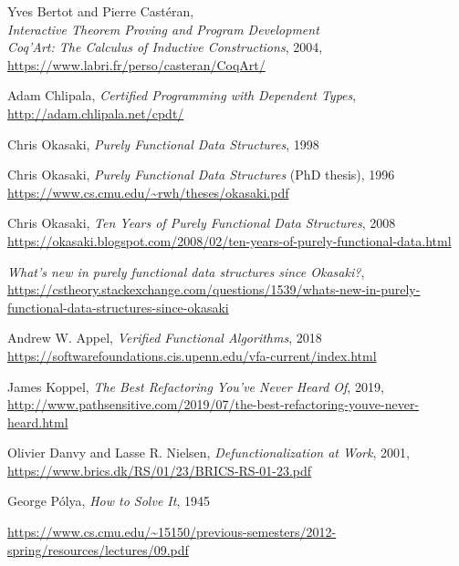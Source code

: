 \documentclass[declaration,mgr,english,shortabstract]{iithesis}
\begin{document}
\begin{thebibliography}{1}
    Yves Bertot and Pierre Castéran, \\
    \textit{Interactive Theorem Proving and Program Development \\ Coq'Art: The Calculus of Inductive Constructions}, 2004, \\
    \url{https://www.labri.fr/perso/casteran/CoqArt/}

    Adam Chlipala,
    \textit{Certified Programming with Dependent Types}, \\
    \url{http://adam.chlipala.net/cpdt/}

    Chris Okasaki,
    \textit{Purely Functional Data Structures}, 1998

    Chris Okasaki,
    \textit{Purely Functional Data Structures} (PhD thesis), 1996 \\
    \url{https://www.cs.cmu.edu/~rwh/theses/okasaki.pdf}

    Chris Okasaki,
    \textit{Ten Years of Purely Functional Data Structures}, 2008 \\
    \url{https://okasaki.blogspot.com/2008/02/ten-years-of-purely-functional-data.html}

    \textit{What's new in purely functional data structures since Okasaki?}, \\
    \url{https://cstheory.stackexchange.com/questions/1539/whats-new-in-purely-functional-data-structures-since-okasaki}

    Andrew W. Appel,
    \textit{Verified Functional Algorithms}, 2018 \\
    \url{https://softwarefoundations.cis.upenn.edu/vfa-current/index.html}

    James Koppel,
    \textit{The Best Refactoring You've Never Heard Of},
    2019, \\
    \url{http://www.pathsensitive.com/2019/07/the-best-refactoring-youve-never-heard.html}

    Olivier Danvy and Lasse R. Nielsen,
    \textit{Defunctionalization at Work},
    2001, \\
    \url{https://www.brics.dk/RS/01/23/BRICS-RS-01-23.pdf}

    George Pólya, \textit{How to Solve It}, 1945

    \url{https://www.cs.cmu.edu/~15150/previous-semesters/2012-spring/resources/lectures/09.pdf}


\end{thebibliography}
\end{document}
